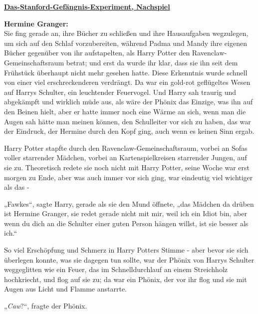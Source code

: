 

\hypertarget{das-stanford-gefuxe4ngnis-experiment-nachspiel}{%

\textbf{\uline{Das-Stanford-Gefängnis-Experiment, Nachspiel}}

\hfill\break \textbf{Hermine Granger:}\\ Sie fing gerade an, ihre Bücher zu schließen und ihre Hausaufgaben wegzulegen, um sich auf den Schlaf vorzubereiten, während Padma und Mandy ihre eigenen Bücher gegenüber von ihr aufstapelten, als Harry Potter den Ravenclaw-Gemeinschaftsraum betrat; und erst da wurde ihr klar, dass sie ihn seit dem Frühstück überhaupt nicht mehr gesehen hatte. Diese Erkenntnis wurde schnell von einer viel erschreckenderen verdrängt. Da war ein gold-rot geflügeltes Wesen auf Harrys Schulter, ein leuchtender Feuervogel. Und Harry sah traurig und abgekämpft und wirklich müde aus, als wäre der Phönix das Einzige, was ihn auf den Beinen hielt, aber er hatte immer noch eine Wärme an sich, wenn man die Augen sah hätte man meinen können, den Schulleiter vor sich zu haben, das war der Eindruck, der Hermine durch den Kopf ging, auch wenn es keinen Sinn ergab.

Harry Potter stapfte durch den Ravenclaw-Gemeinschaftsraum, vorbei an Sofas voller starrender Mädchen, vorbei an Kartenspielkreisen starrender Jungen, auf sie zu. Theoretisch redete sie noch nicht mit Harry Potter, seine Woche war erst morgen zu Ende, aber was auch immer vor sich ging, war eindeutig viel wichtiger als das -

„Fawkes“, sagte Harry, gerade als sie den Mund öffnete, „das Mädchen da drüben ist Hermine Granger, sie redet gerade nicht mit mir, weil ich ein Idiot bin, aber wenn du dich an die Schulter einer guten Person hängen willst, ist sie besser als ich.“

So viel Erschöpfung und Schmerz in Harry Potters Stimme - aber bevor sie sich überlegen konnte, was sie dagegen tun sollte, war der Phönix von Harrys Schulter weggeglitten wie ein Feuer, das im Schnelldurchlauf an einem Streichholz hochkriecht, und flog auf sie zu; da war ein Phönix, der vor ihr flog und sie mit Augen aus Licht und Flamme anstarrte.

„\emph{Caw}?“, fragte der Phönix.

}
